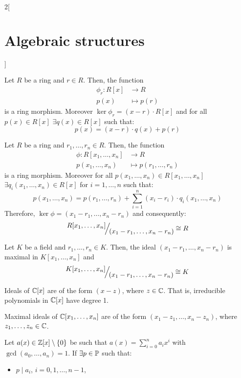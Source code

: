 \documentclass[../../../main.tex]{subfiles}
\begin{document}
\begin{multicols}{2}[\section{Algebraic structures}]
\begin{prop}
\end{prop}
\begin{corollary}
    Let $R$ be a ring and $r\in R$. Then, the function 
    \begin{align*}
        \phi_r:R[x]&\longrightarrow R\\
        p(x)&\longmapsto p(r)        
    \end{align*}
    is a ring morphism. Moreover $\ker\phi_r=(x-r)\cdot R[x]$ and for all $p(x)\in R[x]$ $\exists q(x)\in R[x]$ such that: $$p(x)=(x-r)\cdot q(x)+p(r)$$
\end{corollary}
\begin{corollary}
    Let $R$ be a ring and $r_1,\ldots,r_n\in R$. Then, the function 
    \begin{align*}
        \phi:R[x_1,\ldots,x_n]&\longrightarrow R\\
        p(x_1,\ldots,x_n)&\longmapsto p(r_1,\ldots,r_n)        
    \end{align*}
    is a ring morphism. Moreover for all $p(x_1,\ldots,x_n)\in R[x_1,\ldots,x_n]$ $\exists q_i(x_1,\ldots,x_n)\in R[x]$ for $i=1,\ldots,n$ such that: $$p(x_1,\ldots,x_n)=p(r_1,\ldots,r_n)+\sum_{i=1}^n(x_i-r_i)\cdot q_i(x_1,\ldots,x_n)$$ Therefore, $\ker\phi=(x_1-r_1,\ldots,x_n-r_n)$ and consequently: $$\quot{R[x_1,\ldots,x_n]}{(x_1-r_1,\ldots,x_n-r_n)}\cong R$$
\end{corollary}
\begin{corollary}
    Let $K$ be a field and $r_1,\ldots,r_n\in K$. Then, the ideal $(x_1-r_1,\ldots,x_n-r_n)$ is maximal in $K[x_1,\ldots,x_n]$ and $$\quot{K[x_1,\ldots,x_n]}{(x_1-r_1,\ldots,x_n-r_n)}\cong K$$
\end{corollary}
\begin{theorem}
    Ideals of $\mathbb{C}[x]$ are of the form $(x-z)$, where $z\in\mathbb{C}$. That is, irreducible polynomials in $\mathbb{C}[x]$ have degree 1.
\end{theorem}
\begin{theorem}
    Maximal ideals of $\mathbb{C}[x_1,\ldots,x_n]$ are of the form $(x_1-z_1,\ldots,x_n-z_n)$, where $z_1,\ldots,z_n\in\mathbb{C}$.
\end{theorem}
\begin{theorem}
    Let $a(x)\in\mathbb{Z}[x]\setminus\{0\}$ be such that $a(x)=\sum_{i=0}^na_ix^i$ with $\gcd(a_0,\ldots,a_n)=1$. If $\exists p\in\mathbb{P}$ such that:
    \begin{itemize}
        \item $p\mid a_i$, $i=0,1,\ldots,n-1$,

\end{itemize}
\end{theorem}
\end{multicols}
\end{document}
